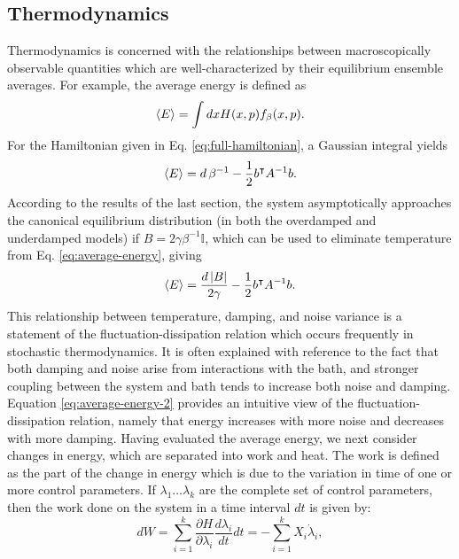 \documentclass[prx,onecolumn,floatfix,longbibliography,notitlepage, nofootinbib,12pt]{revtex4-2}
\begin{document}
\begin{appendix}
\subsection{Thermodynamics}
Thermodynamics is concerned with the relationships between macroscopically observable quantities which are well-characterized by their equilibrium ensemble averages. For example, the average energy is defined as
\begin{equation}
    \braket{E} = \int dx H(x,p) f_\beta(x,p).\\
\end{equation}
For the Hamiltonian given in Eq. \eqref{eq:full-hamiltonian}, a Gaussian integral yields
\begin{equation}
\label{eq:average-energy}
    \braket{E} =  d \, \beta^{-1}-\frac{1}{2}b^\intercal A^{-1} b.
\end{equation}
According to the results of the last section, the system asymptotically approaches the canonical equilibrium distribution (in both the overdamped and underdamped models) if $B = 2\gamma \beta^{-1}\mathbb{I}$, which can be used to eliminate temperature from Eq. \eqref{eq:average-energy}, giving
\begin{equation}
\label{eq:average-energy-2}
    \braket{E} = \frac{d\left|B\right|}{2 \gamma} -\frac{1}{2}b^\intercal A^{-1} b.
\end{equation}
This relationship between temperature, damping, and noise variance is a statement of the fluctuation-dissipation relation which occurs frequently in stochastic thermodynamics. It is often explained with reference to the fact that both damping and noise arise from interactions with the bath, and stronger coupling between the system and bath tends to increase both noise and damping. Equation \eqref{eq:average-energy-2} provides an intuitive view of the fluctuation-dissipation relation, namely that energy increases with more noise and decreases with more damping. Having evaluated the average energy, we next consider changes in energy, which are separated into work and heat. The work is defined as the part of the change in energy which is due to the variation in time of one or more control parameters. If $\lambda_1 \dots \lambda_k$ are the complete set of control parameters, then the work done on the system in a time interval $dt$ is \cite{seifert2008stochastic} given by:
\begin{equation}
    dW = \sum_{i=1}^k \frac{\partial H}{\partial \lambda_i} \frac{d \lambda_i}{d t} dt = -\sum_{i=1}^k X_i \dot{\lambda}_i,
\end{equation}

\end{appendix}
\end{document}
